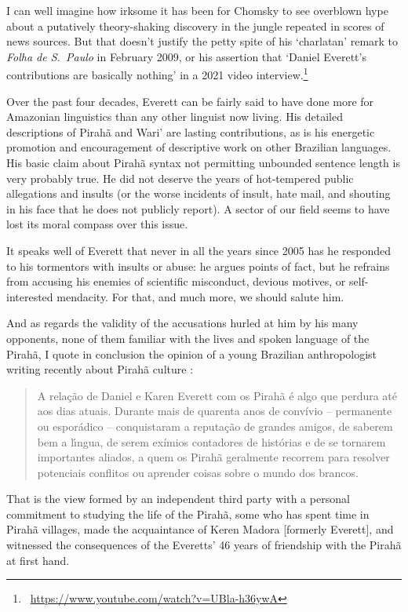 \documentclass[output=paper,colorlinks,citecolor=brown
]{langscibook}
\begin{document}
I can well imagine how irksome it has been for Chomsky to see overblown
hype about a putatively theory-shaking discovery in the jungle repeated
in scores of news sources. But that doesn't justify the petty spite of
his `charlatan' remark to \textit{Folha de S.~Paulo} in February 2009,
or his assertion that `Daniel Everett's contributions are basically
nothing' in a 2021 video interview.\footnote{\,
   \url{https://www.youtube.com/watch?v=UBla-h36ywA}}

Over the past four decades, Everett can be fairly said to have done
more for Amazonian linguistics than any other linguist now living.
His detailed descriptions of Pirah{\~a} and Wari' are lasting
contributions, as is his energetic promotion and encouragement of
descriptive work on other Brazilian languages. His basic claim about
Pirah{\~a} syntax not permitting unbounded sentence length is very
probably true. He did not deserve the years of hot-tempered public
allegations and insults (or the worse incidents of insult, hate mail,
and shouting in his face that he does not publicly report). A sector
of our field seems to have lost its moral compass over this issue.

It speaks well of Everett that never in all the years since 2005 has
he responded to his tormentors with insults or abuse: he argues points
of fact, but he refrains from accusing his enemies of scientific
misconduct, devious motives, or self-interested mendacity. For that,
and much more, we should salute him.

And as regards the validity of the accusations hurled at him by his
many opponents, none of them familiar with the lives and spoken
language of the Pirah{\~a}, I quote in conclusion the opinion of a
young Brazilian anthropologist writing recently about Pirah{\~a}
culture \citep{Felizes23}:
\begin{quote}
A rela{\c{c}}{\~a}o de Daniel e Karen Everett com os Pirah{\~a} {\'e}
algo que perdura at{\'e} aos dias atuais. Durante mais de quarenta
anos de convívio – permanente ou espor{\'a}dico – conquistaram a
reputa{\c{c}}{\~a}o de grandes amigos, de saberem bem a l{\'\i}ngua, de
serem exímios contadores de histórias e de se tornarem importantes
aliados, a quem os Pirah{\~a} geralmente recorrem para resolver
potenciais conflitos ou aprender coisas sobre o mundo dos brancos.

\end{quote}
That is the view formed by an independent third party with a personal
commitment to studying the life of the Pirah{\~a}, some who has spent time
in Pirah{\~a} villages, made the acquaintance of Keren Madora [formerly
Everett], and witnessed the consequences of the Everetts' 46 years of
friendship with the Pirah{\~a} at first hand.
\end{document}

